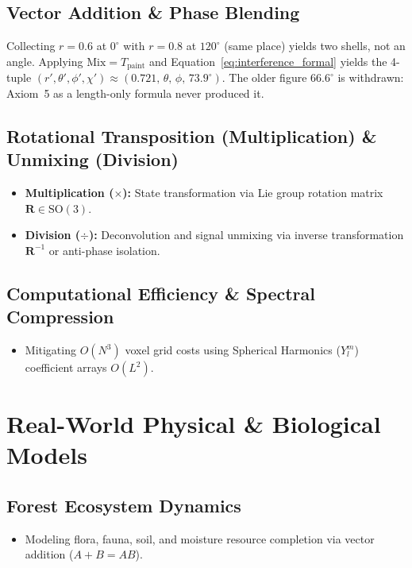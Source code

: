 \documentclass[12pt, a4paper]{article}
\begin{document}
\subsection{Vector Addition \& Phase Blending}
Collecting $r=0.6$ at $0^\circ$ with $r=0.8$ at $120^\circ$ (same
place) yields two shells, not an angle. Applying
$\mathrm{Mix}=T_{\mathrm{paint}}$ and
Equation~\eqref{eq:interference_formal} yields the 4-tuple
$(r',\theta',\phi',\chi')\approx(0.721,\,\theta,\,\phi,\,73.9^\circ)$.
The older figure $66.6^\circ$ is withdrawn: Axiom~5 as a length-only
formula never produced it.

\subsection{Rotational Transposition (Multiplication) \& Unmixing (Division)}
\begin{itemize}
    \item \textbf{Multiplication ($\times$):} State transformation via Lie group rotation matrix $\mathbf{R} \in \mathrm{SO}(3)$.
    \item \textbf{Division ($\div$):} Deconvolution and signal unmixing via inverse transformation $\mathbf{R}^{-1}$ or anti-phase isolation.
\end{itemize}

\subsection{Computational Efficiency \& Spectral Compression}
\begin{itemize}
    \item Mitigating $O(N^3)$ voxel grid costs using Spherical Harmonics ($Y_l^m$) coefficient arrays $O(L^2)$.
\end{itemize}

\section{Real-World Physical \& Biological Models}
\subsection{Forest Ecosystem Dynamics}
\begin{itemize}
    \item Modeling flora, fauna, soil, and moisture resource completion via vector addition ($A + B = AB$).
\end{itemize}
\end{document}
